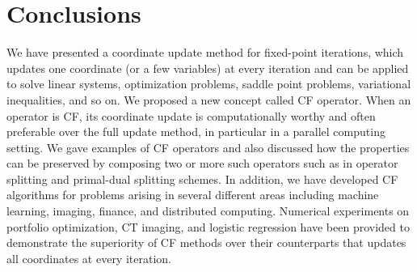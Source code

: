 \section{Conclusions}
We have presented a coordinate update method for fixed-point iterations, which updates one coordinate (or a few variables) at every iteration and can be applied to solve linear systems, optimization problems, saddle point problems, variational inequalities, and so on. We proposed a new concept called CF operator. When an operator is CF, its coordinate update is computationally worthy and often preferable over the full update method, in particular in a parallel computing setting. We gave examples of CF operators and also discussed how the properties can be preserved by composing two or more such operators such as in operator splitting and primal-dual splitting schemes. In addition, we have developed CF algorithms for problems arising in several different areas including machine learning, imaging, finance, and distributed computing. Numerical experiments on portfolio optimization, CT imaging, and logistic regression have been provided to demonstrate the superiority of CF methods over their counterparts that updates all coordinates at every iteration. 
